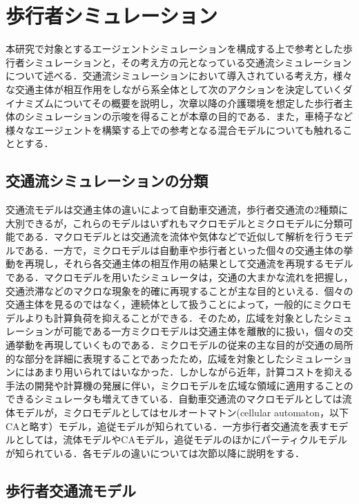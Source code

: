 \chapter{歩行者シミュレーション}

本研究で対象とするエージェントシミュレーションを構成する上で参考とした歩行者シミュレーションと，その考え方の元となっている交通流シミュレーションについて述べる．交通流シミュレーションにおいて導入されている考え方，様々な交通主体が相互作用をしながら系全体として次のアクションを決定していくダイナミズムについてその概要を説明し，次章以降の介護環境を想定した歩行者主体のシミュレーションの示唆を得ることが本章の目的である．また，車椅子など様々なエージェントを構築する上での参考となる混合モデルについても触れることとする．

\section{交通流シミュレーションの分類}

交通流モデルは交通主体の違いによって自動車交通流，歩行者交通流の2種類に大別できるが，これらのモデルはいずれもマクロモデルとミクロモデルに分類可能である．マクロモデルとは交通流を流体や気体などで近似して解析を行うモデルである．一方で，ミクロモデルは自動車や歩行者といった個々の交通主体の挙動を再現し，それら各交通主体の相互作用の結果として交通流を再現するモデルである．マクロモデルを用いたシミュレータは，交通の大まかな流れを把握し，交通渋滞などのマクロな現象を的確に再現することが主な目的といえる．個々の交通主体を見るのではなく，連続体として扱うことによって，一般的にミクロモデルよりも計算負荷を抑えることができる．そのため，広域を対象としたシミュレーションが可能である一方ミクロモデルは交通主体を離散的に扱い，個々の交通挙動を再現していくものである．ミクロモデルの従来の主な目的が交通の局所的な部分を詳細に表現することであったため，広域を対象としたシミュレーションにはあまり用いられてはいなかった．しかしながら近年，計算コストを抑える手法の開発や計算機の発展に伴い，ミクロモデルを広域な領域に適用することのできるシミュレータも増えてきている．自動車交通流のマクロモデルとしては流体モデルが，ミクロモデルとしてはセルオートマトン(cellular automaton，以下CAと略す）モデル，追従モデルが知られている．一方歩行者交通流を表すモデルとしては，流体モデルやCAモデル，追従モデルのほかにパーティクルモデルが知られている．各モデルの違いについては次節以降に説明をする．

\section{歩行者交通流モデル}

